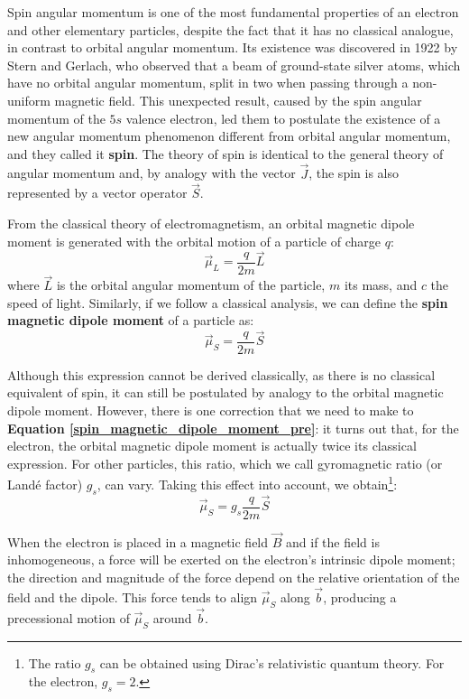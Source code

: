 Spin angular momentum is one of the most fundamental properties of an electron and other elementary particles, despite the fact that it has no classical analogue, in contrast to orbital angular momentum. Its existence was discovered in 1922 by Stern and Gerlach, who observed that a beam of ground-state silver atoms, which have no orbital angular momentum, split in two when passing through a non-uniform magnetic field. This unexpected result, caused by the spin angular momentum of the $5s$ valence electron, led them to postulate the existence of a new angular momentum phenomenon different from orbital angular momentum, and they called it \textbf{spin}. The theory of spin is identical to the general theory of angular momentum and, by analogy with the vector $\vec{J}$, the spin is also represented by a vector operator $\vec{S}$.

From the classical theory of electromagnetism, an orbital magnetic dipole moment is generated with the orbital motion of a particle of charge $q$:
\begin{equation} \label{orbital_magnetic_dipole_moment}
    \vec{\mu}_L = \frac{q}{2m}\vec{L}
\end{equation}
where $\vec{L}$ is the orbital angular momentum of the particle, $m$ its mass, and $c$ the speed of light. Similarly, if we follow a classical analysis, we can define the \textbf{spin magnetic dipole moment} of a particle as:
\begin{equation} \label{spin_magnetic_dipole_moment_pre}
    \vec{\mu}_S = \frac{q}{2m}\vec{S}
\end{equation}

Although this expression cannot be derived classically, as there is no classical equivalent of spin, it can still be postulated by analogy to the orbital magnetic dipole moment. However, there is one correction that we need to make to \textbf{Equation \ref{spin_magnetic_dipole_moment_pre}}: it turns out that, for the electron, the orbital magnetic dipole moment is actually twice its classical expression. For other particles, this ratio, which we call gyromagnetic ratio (or Landé factor) $g_s$, can vary. Taking this effect into account, we obtain\footnote{The ratio $g_s$ can be obtained using Dirac's relativistic quantum theory. For the electron, $g_s = 2$.}:
\begin{equation} \label{spin_magnetic_dipole_moment}
    \vec{\mu}_S = g_s\frac{q}{2m}\vec{S}
\end{equation}

When the electron is placed in a magnetic field $\vec{B}$ and if the field is inhomogeneous, a force will be exerted on the electron's intrinsic dipole moment; the direction and magnitude of the force depend on the relative orientation of the field and the dipole. This force tends to align $\vec{\mu}_S$  along $\vec{b}$, producing a precessional motion of $\vec{\mu}_S$ around $\vec{b}$.



